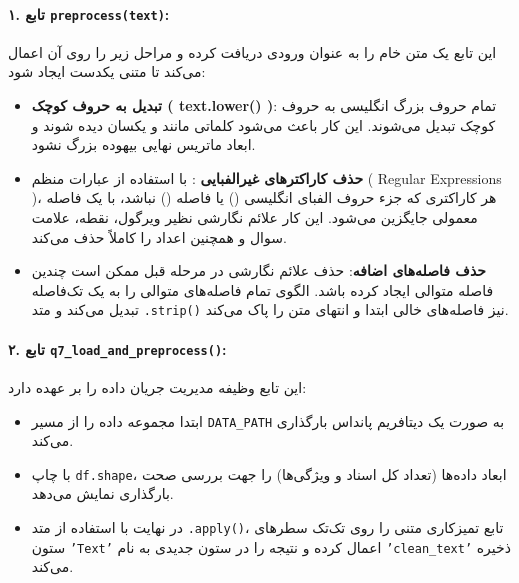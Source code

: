 \documentclass{article}
\begin{document}
    \paragraph{۱. تابع \texttt{preprocess(text)}:}\hspace{-10pt}
    این تابع یک متن خام را به عنوان ورودی دریافت کرده و مراحل زیر را روی آن اعمال می‌کند تا متنی یکدست ایجاد شود:
    \begin{itemize}
        \item \textbf{تبدیل به حروف کوچک ( text.lower() )}: 
        تمام حروف بزرگ انگلیسی به حروف کوچک تبدیل می‌شوند. این کار باعث می‌شود کلماتی مانند  و  یکسان دیده شوند و ابعاد ماتریس نهایی بیهوده بزرگ نشود.
        
        \item \textbf{حذف کاراکترهای غیرالفبایی} : 
        با استفاده از عبارات منظم ( Regular Expressions )، هر کاراکتری که جزء حروف الفبای انگلیسی () یا فاصله () نباشد، با یک فاصله معمولی جایگزین می‌شود. این کار علائم نگارشی نظیر ویرگول، نقطه، علامت سوال و همچنین اعداد را کاملاً حذف می‌کند.
        
        \item \textbf{حذف فاصله‌های اضافه}: 
        حذف علائم نگارشی در مرحله قبل ممکن است چندین فاصله متوالی ایجاد کرده باشد. الگوی  تمام فاصله‌های متوالی را به یک تک‌فاصله تبدیل می‌کند و متد \texttt{.strip()} نیز فاصله‌های خالی ابتدا و انتهای متن را پاک می‌کند.
    \end{itemize}

    \paragraph{۲. تابع \texttt{q7\_load\_and\_preprocess()}:}\hspace{-10pt}
    این تابع وظیفه مدیریت جریان داده را بر عهده دارد:
    \begin{itemize}
        \item ابتدا مجموعه داده را از مسیر \texttt{DATA\_PATH} به صورت یک دیتافریم پانداس بارگذاری می‌کند.
        \item با چاپ \texttt{df.shape}، ابعاد داده‌ها (تعداد کل اسناد و ویژگی‌ها) را جهت بررسی صحت بارگذاری نمایش می‌دهد.
        \item در نهایت با استفاده از متد \texttt{.apply()}، تابع تمیزکاری متنی را روی تک‌تک سطرهای ستون \texttt{'Text'} اعمال کرده و نتیجه را در ستون جدیدی به نام \texttt{'clean\_text'} ذخیره می‌کند.
    \end{itemize}
\end{document}
